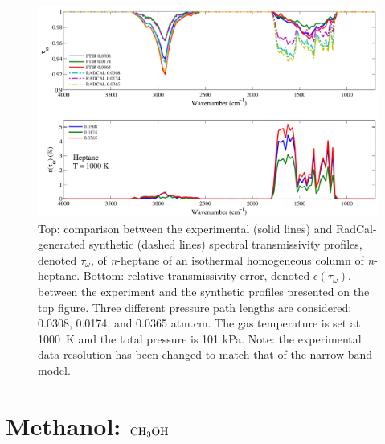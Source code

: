 \begin{figure}[p]
\includegraphics[width=\textwidth]{../Verification/Results_Test2/Heptane_1000.pdf}
\caption{Top: comparison between the experimental (solid lines) and RadCal-generated synthetic (dashed lines) spectral transmissivity profiles, denoted $\tau_{\omega}$, of \textit{n}-heptane of an isothermal homogeneous column of \textit{n}-heptane. Bottom: relative transmissivity error, denoted $\epsilon{(\tau_{\omega})}$, between the experiment and the synthetic profiles presented on the top figure. Three different pressure path lengths are considered: 0.0308, 0.0174, and 0.0365 atm.cm. The gas temperature is set at 1000~K and the total pressure is 101 kPa. Note: the experimental data resolution has been changed to match that of the narrow band model. \label{fig:nheptane_Verify_1000K}}
\end{figure}


\clearpage

\section{Methanol: $\rm CH_3OH$}

